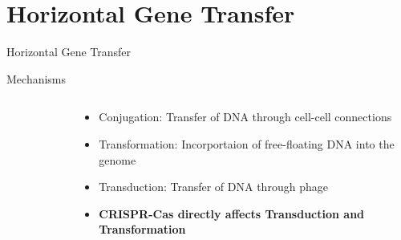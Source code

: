 \documentclass[dvipsnames]{beamer}
\begin{document}
\section{Horizontal Gene Transfer}
\begin{frame}{}
    \begin{center}
        \Huge \textcolor{OliveGreen}{Horizontal Gene Transfer}
    \end{center}
    \addtocounter{framenumber}{-1}
\end{frame}
\begin{frame}[fragile]{Mechanisms}
    \begin{columns}
    \begin{column}{0.5\textwidth}
        \begin{figure}[htb!]
            \autocite{trendslgt}
        \end{figure}
    \end{column}
    \begin{column}{0.5\textwidth}
        \begin{itemize}
            \item<2-> Conjugation: Transfer of DNA through cell-cell connections\autocite{trendslgt}
            \item<3-> Transformation: Incorportaion of free-floating DNA into the genome\autocite{trendslgt}
            \item<4-> Transduction: Transfer of DNA through phage\autocite{trendslgt}
            \item<5-> \textbf{CRISPR-Cas directly affects Transduction and Transformation}\autocite{trendslgt}
        \end{itemize}
    \end{column}
    \end{columns}
\end{frame}
\end{document}
